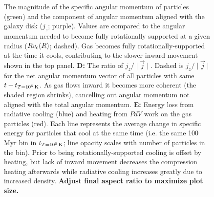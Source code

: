\documentclass[fleqn,usenatbib]{mnras}
\newcommand{\tcon}{t_{T=10^5\,{\rm K}}}
\begin{document}
\begin{figure}
{The magnitude of the specific angular momentum of particles (green) and the component of angular momentum aligned with the galaxy disk ($j_z$; purple).
Values are compared to the angular momentum needed to become fully rotationally supported at a given radius ($Rv_{\rm c}(R)$; dashed).
Gas becomes fully rotationally-supported at the time it cools, contributing to the slower inward movement shown in the top panel.
\textbf{D:}
The ratio of $j_z / \mid \vec j \mid$.
Dashed is $j_z / \mid \vec j \mid$ for the net angular momentum vector of all particles with same $t - \tcon$.
As gas flows inward it becomes more coherent (the shaded region shrinks), cancelling out angular momentum not aligned with the total angular momentum.
\textbf{E:}
Energy loss from radiative cooling (blue) and heating from $PdV$ work on the gas particles (red).
Each line represents the average change in specific energy for particles that cool at the same time (i.e. the same 100 Myr bin in $\tcon$; line opacity scales with number of particles in the bin).
Prior to being rotationally-supported cooling is offset by heating, but lack of inward movement decreases the compression heating afterwards while radiative cooling increases greatly due to increased density.
\textbf{
Adjust final aspect ratio to maximize plot size.
}
}
\label{f: before and after}
\end{figure}


\end{document}
